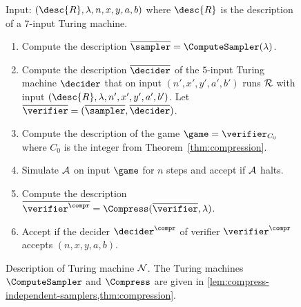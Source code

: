 \begin{figure}[!htb]
  \centering
  \begin{gamespec}
    Input: $(\desc{R}, \lambda, n, x, y, a, b)$ where $\desc{R}$ is
    the description of a $7$-input Turing machine.
    \begin{enumerate}
    \item Compute the description $\overline{\sampler} = \ComputeSampler(\lambda)$.
    \item Compute the description $\overline{\decider}$ of the $5$-input Turing
      machine $\decider$ that on input $(n', x', y', a', b')$ runs $\cal{R}$ with
      input $(\desc{R}, \lambda, n', x', y', a', b')$.
      Let $\overline{\verifier} = (\overline{\sampler}, \overline{\decider})$.
    \item Compute the description of the game $\game = \verifier_{C_0}$ where
      $C_0$ is the integer from Theorem~\ref{thm:compression}.
    \item Simulate $\cal{A}$ on input $\game$ for $n$ steps and accept if
      $\cal{A}$ halts.
    \item Compute the description $\overline{\verifier^\compr} =
      \Compress(\overline{\verifier}, \lambda)$.
    \item Accept if the decider $\decider^\compr$ of verifier
      $\verifier^\compr$ accepts $(n, x, y, a, b)$.
    \end{enumerate}
  \end{gamespec}
  \caption{Description of Turing machine $\cal{N}$.
    The Turing machines $\ComputeSampler$ and $\Compress$ are given in
    \cref{lem:compress-independent-samplers,thm:compression}.}
  \label{fig:separation}
\end{figure}



